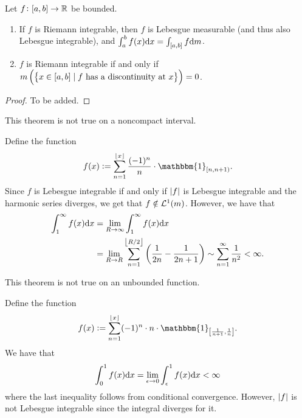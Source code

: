 \documentclass[11pt,a4paper]{article}
\begin{document}
\begin{theorem}
  Let $f \colon [a,b] \to \mathbb{R}$ be bounded.
  \begin{enumerate}
    \item[(1)] If $f$ is Riemann integrable, then $f$ is Lebesgue measurable
      (and thus also Lebesgue integrable),
      and $\int_{a}^{b} f(x) \dx = \int_{[a,b]} f \dm$.
    \item[(2)] $f$ is Riemann integrable if and only if
      $m\del{\set{x \in [a,b] \mid \text{$f$ has a discontinuity at $x$}}}
      = 0$.
  \end{enumerate}
\end{theorem}
\begin{proof}
  To be added.
\end{proof}
\begin{remark}
  This theorem is not true on a noncompact interval.
\end{remark}
\begin{example}
  Define the function
  \[
    f(x) :=
    \sum_{n=1}^{\floor{x}} \frac{(-1)^n}{n} \cdot \mathbbm{1}_{[n,n+1)}.
  \]
  Since $f$ is Lebesgue integrable if and only if $\left\lvert f\right\rvert$ is Lebesgue
  integrable and the harmonic series diverges,
  we get that $f \notin \mathcal{L}^1(m)$.
  However, we have that
  \begin{align*}
    \int_{1}^{\infty} f(x) \dx &=
    \lim_{R \to \infty} \int_{1}^{\infty} f(x) \dx \\ &=
    \lim_{R \to R} \sum_{n=1}^{\floor{R/2}}
    \del{\frac{1}{2n} - \frac{1}{2n + 1}} \sim
    \sum_{n=1}^{\infty} \frac{1}{n^2} < \infty.
  \end{align*}
\end{example}
\begin{remark}
  This theorem is not true on an unbounded function.
\end{remark}
\begin{example}
  Define the function
  \[
    f(x) := \sum_{n=1}^{\floor{x}} (-1)^n \cdot n \cdot
    \mathbbm{1}_{\left[\frac{1}{n+1},\frac{1}{n}\right]}.
  \]
  We have that
  \[
    \int_{0}^{1} f(x) \dx =
    \lim_{\epsilon \to 0} \int_{\epsilon}^{1} f(x) \dx < \infty
  \]
  where the last inequality follows from conditional convergence.
  However, $\left\lvert f\right\rvert$ is not Lebesgue integrable since the integral
  diverges for it.
\end{example}


\newpage
\end{document}
